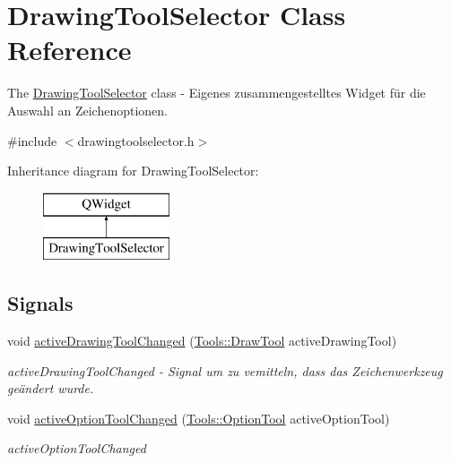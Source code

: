 \hypertarget{class_drawing_tool_selector}{}\section{Drawing\+Tool\+Selector Class Reference}
\label{class_drawing_tool_selector}


The \hyperlink{class_drawing_tool_selector}{Drawing\+Tool\+Selector} class -\/ Eigenes zusammengestelltes Widget für die Auswahl an Zeichenoptionen.  




{\ttfamily \#include $<$drawingtoolselector.\+h$>$}

Inheritance diagram for Drawing\+Tool\+Selector\+:\begin{figure}[H]
\begin{center}
\leavevmode
\includegraphics[height=2.000000cm]{class_drawing_tool_selector}
\end{center}
\end{figure}
\subsection*{Signals}
\begin{DoxyCompactItemize}
\item 
void \hyperlink{class_drawing_tool_selector_afd6c053c93d273fc110e8f11c0631ff3}{active\+Drawing\+Tool\+Changed} (\hyperlink{class_tools_ab031688a77e89a80ce8b5db7014684a3}{Tools\+::\+Draw\+Tool} active\+Drawing\+Tool)
\begin{DoxyCompactList}\small\item\em active\+Drawing\+Tool\+Changed -\/ Signal um zu vemitteln, dass das Zeichenwerkzeug geändert wurde. \end{DoxyCompactList}\item 
void \hyperlink{class_drawing_tool_selector_a062791d4a8183a6f20ecd12975ddc72d}{active\+Option\+Tool\+Changed} (\hyperlink{class_tools_a4b55b2ca4eef4d80ae1042233832bb8b}{Tools\+::\+Option\+Tool} active\+Option\+Tool)
\begin{DoxyCompactList}\small\item\em active\+Option\+Tool\+Changed \end{DoxyCompactList}\end{DoxyCompactItemize}
